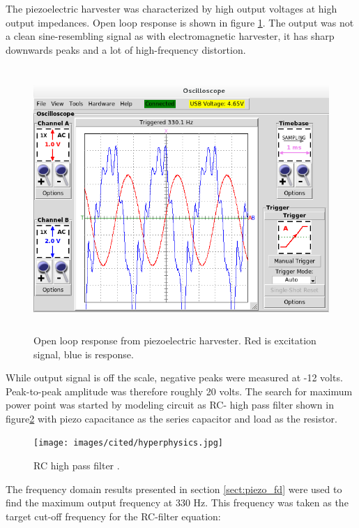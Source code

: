 The piezoelectric harvester was characterized by high output voltages at high output impedances. Open loop response is shown in figure \ref{fig:piezo_td_open}. The output was not a clean sine-resembling signal as with electromagnetic harvester, it has sharp downwards peaks and a lot of high-frequency distortion.

\begin{figure}[htb]
\begin{center}
\includegraphics[height=10cm]{images/own_measurement/generator_shaker/piezo_td_open_330hz_2_2.png}
\end{center}
\caption{\label{fig:piezo_td_open} Open loop response from piezoelectric harvester. Red is excitation signal, blue is response.}
\end{figure}

While output signal is off the scale, negative peaks were measured at -12 volts. Peak-to-peak amplitude was therefore roughly 20 volts. The search for maximum power point was started by modeling circuit as RC- high pass filter shown in figure\ref{fig:rc_highpass} with piezo capacitance as the series capacitor and load as the resistor. 

\begin{figure}[htb]
\begin{center}
\texttt{[image: images/cited/hyperphysics.jpg]}
\end{center}
\caption{\label{fig:rc_highpass} RC high pass filter \cite{hyperphysics}.}
\end{figure}

The frequency domain results presented in section \ref{sect:piezo_fd} were used to find the maximum output frequency at 330 Hz. This frequency was taken as the target cut-off frequency for the RC-filter equation:

